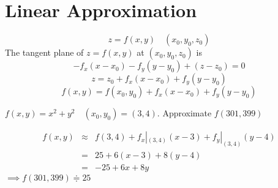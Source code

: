 \section{Linear Approximation}
\begin{notn}
\[z = f(x, y) \quad (x_0, y_0, z_0)\]
The tangent plane of \(z = f(x, y)\) at \((x_0, y_0, z_0)\) is
\[- f_x(x - x_0) - f_y(y - y_0) + (z - z_0) = 0\]
\[z = z_0 + f_x(x - x_0) + f_y(y - y_0)\]
\[f(x, y) = f(x_0, y_0) + f_x(x - x_0) + f_y(y - y_0)\]
\end{notn}
\begin{eg}
\(f(x, y) = x^2 + y^2 \quad (x_0, y_0) = (3, 4)\). Approximate \(f(301, 399)\)

\soln
\[\begin{array}{rcl}
f(x, y) & \approx & f(3, 4) + f_x|_{(3, 4)} (x - 3) + f_y|_{(3, 4)} (y - 4)\\
& = & 25 + 6(x - 3) + 8(y - 4)\\
& = & -25  + 6x + 8y
\end{array}\]
\(\implies f(301, 399) \Doteq 25\)
\end{eg}
